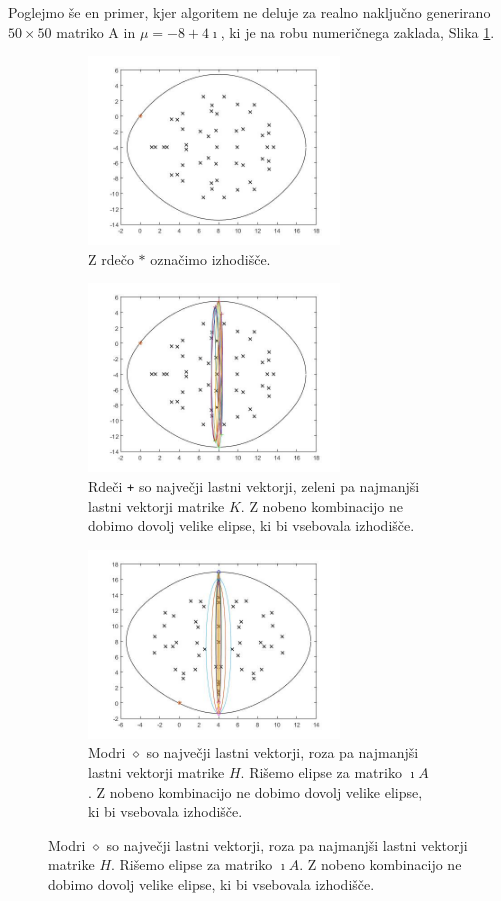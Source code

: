 \documentclass[12pt,a4paper]{amsart}
\theoremstyle{definition}
\theoremstyle{plain}
\begin{document}
Poglejmo še en primer, kjer algoritem ne deluje za realno naključno generirano $50\times 50$ matriko A in $\mu = -8+4\imath$, ki je na robu numeričnega zaklada, Slika \ref{fig:p61}.
\begin{figure}[H]
\begin{subfigure}[t]{0.45\textwidth}
\includegraphics[width=0.9\linewidth,height=5cm]{RC4.jpg}
\caption{Z rdečo $\ast$ označimo izhodišče.}
\label{fig:p61}
\end{subfigure}%
\hfill
\begin{subfigure}[t]{0.45\textwidth}
\includegraphics[width=0.9\linewidth,height=5cm]{RC4e1.jpg}
\caption{Rdeči \verb~+~ so največji lastni vektorji, zeleni pa najmanjši lastni vektorji matrike $K$\footnotemark[\value{footnote}]. Z nobeno kombinacijo ne dobimo dovolj velike elipse, ki bi vsebovala izhodišče.}
\label{fig:p62}
\end{subfigure}
\begin{subfigure}[t]{0.45\textwidth}
\includegraphics[width=0.9\linewidth,height=5cm]{RC4e2.jpg}
\caption{Modri $\diamond$ so največji lastni vektorji, roza pa najmanjši lastni vektorji matrike $H$\footnotemark[\value{footnote}]. Rišemo elipse za matriko $\imath A$. Z nobeno kombinacijo ne dobimo dovolj velike elipse, ki bi vsebovala izhodišče.}

\end{subfigure}
\end{figure}
\end{document}
